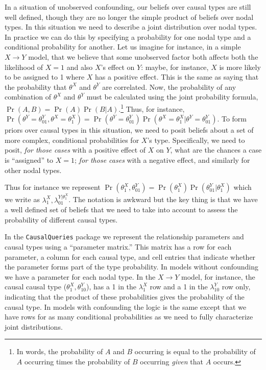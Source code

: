\documentclass[
  12pt,
]{book}
\begin{document}
In a situation of unobserved confounding, our beliefs over causal types are still well defined, though they are no longer the simple product of beliefs over nodal types. In this situation we need to describe a joint distribution over nodal types. In practice we can do this by specifying a probability for one nodal type and a conditional probability for another. Let us imagine for instance, in a simple \(X \rightarrow Y\) model, that we believe that some unobserved factor both affects both the likelihood of \(X = 1\) and also \(X\)'s effect on \(Y\): maybe, for instance, \(X\) is more likely to be assigned to 1 where \(X\) has a positive effect. This is the same as saying that the probability that \(\theta^X\) and \(\theta^Y\) are correlated. Now, the probability of any combination of \(\theta^X\) and \(\theta^Y\) must be calculated using the joint probability formula, \(\Pr(A, B) = \Pr(A)\Pr(B|A)\).\footnote{In words, the probability of \(A\) and \(B\) occurring is equal to the probability of \(A\) occurring times the probability of \(B\) occurring \emph{given} that \(A\) occurs.} Thus, for instance, \(\Pr(\theta^Y = \theta^Y_{01}, \theta^X = \theta^X_1) = \Pr(\theta^Y = \theta^Y_{01})\Pr(\theta^X = \theta^X_1 | \theta^Y = \theta^Y_{01})\). To form priors over causal types in this situation, we need to posit beliefs about a set of more complex, conditional probabilities for \(X\)'s type. Specifically, we need to posit, \emph{for those cases} with a positive effect of \(X\) on \(Y\), what are the chances a case is ``assigned'' to \(X=1\); \emph{for those cases} with a negative effect, and similarly for other nodal types.

Thus for instance we represent \(\Pr(\theta^X_1, \theta^Y_{01}) = \Pr(\theta^X_1)\Pr(\theta^Y_{01}|\theta^X_1)\) which we write as \(\lambda^X_1, \lambda^{Y|\theta^X_1}_{01}\). The notation is awkward but the key thing is that we have a well defined set of beliefs that we need to take into account to assess the probability of different causal types.

In the \texttt{CausalQueries} package we represent the relationship parameters and causal types using a ``parameter matrix.'' This matrix has a row for each parameter, a column for each causal type, and cell entries that indicate whether the parameter forms part of the type probability. In models without confounding we have a parameter for each nodal type. In the \(X \rightarrow Y\) model, for instance, the causal causal type (\(\theta^X_1, \theta^Y_{10}\)), has a 1 in the \(\lambda^X_1\) row and a 1 in the \(\lambda^Y_{10}\) row only, indicating that the product of these probabilities gives the probability of the causal type. In models with confounding the logic is the same except that we have rows for as many conditional probabilities as we need to fully characterize joint distributions.
\end{document}
